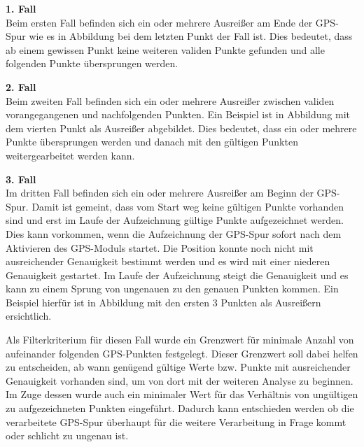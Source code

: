 \textbf{1. Fall}\\
Beim ersten Fall befinden sich ein oder mehrere Ausreißer am Ende der GPS-Spur wie es in Abbildung  bei dem letzten Punkt der Fall ist. Dies bedeutet, dass ab einem gewissen Punkt keine weiteren validen Punkte gefunden und alle folgenden Punkte übersprungen werden.


\textbf{2. Fall}\\
Beim zweiten Fall befinden sich ein oder mehrere Ausreißer zwischen validen vorangegangenen und nachfolgenden Punkten. Ein Beispiel ist in Abbildung  mit dem vierten Punkt als Ausreißer abgebildet. Dies bedeutet, dass ein oder mehrere Punkte übersprungen werden und danach mit den gültigen Punkten weitergearbeitet werden kann.


\textbf{3. Fall}\\
Im dritten Fall befinden sich ein oder mehrere Ausreißer am Beginn der GPS-Spur. Damit ist gemeint, dass vom Start weg keine gültigen Punkte vorhanden sind und erst im Laufe der Aufzeichnung gültige Punkte aufgezeichnet werden. Dies kann vorkommen, wenn die Aufzeichnung der GPS-Spur sofort nach dem Aktivieren des GPS-Moduls startet. Die Position konnte noch nicht mit ausreichender Genauigkeit bestimmt werden und es wird mit einer niederen Genauigkeit gestartet. Im Laufe der Aufzeichnung steigt die Genauigkeit und es kann zu einem Sprung von ungenauen zu den genauen Punkten kommen. Ein Beispiel hierfür ist in Abbildung  mit den ersten 3 Punkten als Ausreißern ersichtlich.


Als Filterkriterium für diesen Fall wurde ein Grenzwert für minimale Anzahl von aufeinander folgenden GPS-Punkten festgelegt. Dieser Grenzwert soll dabei helfen zu entscheiden, ab wann genügend gültige Werte bzw. Punkte mit ausreichender Genauigkeit vorhanden sind, um von dort mit der weiteren Analyse zu beginnen. Im Zuge dessen wurde auch ein minimaler Wert für das Verhältnis von ungültigen zu aufgezeichneten Punkten eingeführt. Dadurch kann entschieden werden ob die verarbeitete GPS-Spur überhaupt für die weitere Verarbeitung in Frage kommt oder schlicht zu ungenau ist.

